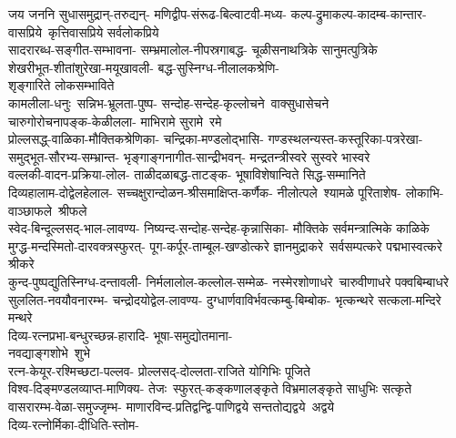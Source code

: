 \begin{multicols}{2}
\begin{flushleft}
जय जननि सुधासमुद्रान्-तरुद्यन्-
मणिद्वीप-संरूढ-बिल्वाटवी-मध्य-
कल्प-द्रुमाकल्प-कादम्ब-कान्तार-
वासप्रिये~कृत्तिवासप्रिये सर्वलोकप्रिये\\
\medskip
सादरारब्ध-सङ्गीत-सम्भावना-
सम्भ्रमालोल-नीपस्रगाबद्ध-
चूळीसनाथत्रिके सानुमत्पुत्रिके\\
\medskip
शेखरीभूत-शीतांशुरेखा-मयूखावली-
बद्ध-सुस्निग्ध-नीलालकश्रेणि-\\
शृङ्गारिते लोकसम्भाविते\\
\medskip
\mbox{कामलीला-धनुः~सन्निभ-भ्रूलता-पुष्प-}
\mbox{सन्दोह-सन्देह-कृल्लोचने~वाक्सुधासेचने}\\
\medskip
चारुगोरोचनापङ्क-केळीलला-
माभिरामे सुरामे~रमे\\
\medskip
प्रोल्लसद्ध्-वाळिका-मौक्तिकश्रेणिका-
चन्द्रिका-मण्डलोद्भासि-
गण्डस्थलन्यस्त-कस्तूरिका-पत्ररेखा-
समुद्भूत-सौरभ्य-सम्भ्रान्त-
भृङ्गाङ्गनागीत-सान्द्रीभवन्-
मन्द्रतन्त्रीस्वरे सुस्वरे भास्वरे\\
\medskip
वल्लकी-वादन-प्रक्रिया-लोल-
ताळीदळाबद्ध-ताटङ्क-
भूषाविशेषान्विते सिद्ध-सम्मानिते\\
\medskip
दिव्यहालाम-दोद्वेलहेलाल-
सच्चक्षुरान्दोळन-श्रीसमाक्षिप्त-कर्णैक-
नीलोत्पले~श्यामळे पूरिताशेष-
लोकाभि-वाञ्छाफले~श्रीफले\\
\medskip
स्वेद-बिन्दूल्लसद्-भाल-लावण्य-
निष्यन्द-सन्दोह-सन्देह-कृन्नासिका-
मौक्तिके सर्वमन्त्रात्मिके काळिके\\
\medskip
मुग्द्ध-मन्दस्मितो-दारवक्त्रस्फुरत्-
पूग-कर्पूर-ताम्बूल-खण्डोत्करे 
ज्ञानमुद्राकरे~सर्वसम्पत्करे
पद्मभास्वत्करे श्रीकरे\\
\medskip
कुन्द-पुष्पद्युतिस्निग्ध-दन्तावली-
निर्मलालोल-कल्लोल-सम्मेळ-
नस्मेरशोणाधरे~चारुवीणाधरे पक्वबिम्बाधरे\\
\medskip
सुललित-नवयौवनारम्भ-
चन्द्रोदयोद्वेल-लावण्य-
दुग्धार्णवाविर्भवत्कम्बु-बिम्बोक-
भृत्कन्थरे सत्कला-मन्दिरे मन्थरे\\
\medskip
दिव्य-रत्नप्रभा-बन्धुरच्छन्न-हारादि-
भूषा-समुद्योतमाना-\\
नवद्याङ्गशोभे~शुभे\\
\medskip
रत्न-केयूर-रश्मिच्छटा-पल्लव-
प्रोल्लसद्-दोल्लता-राजिते योगिभिः पूजिते\\
\medskip
विश्व-दिङ्मण्डलव्याप्त-माणिक्य-
तेजः~स्फुरत्-कङ्कणालङ्कृते 
विभ्रमालङ्कृते साधुभिः सत्कृते\\
\medskip
वासरारम्भ-वेळा-समुज्जृम्भ-
माणारविन्द-प्रतिद्वन्द्वि-पाणिद्वये
सन्ततोद्यद्वये~अद्वये\\
\medskip
दिव्य-रत्नोर्मिका-दीधिति-स्तोम-

\end{flushleft}
\end{multicols}
